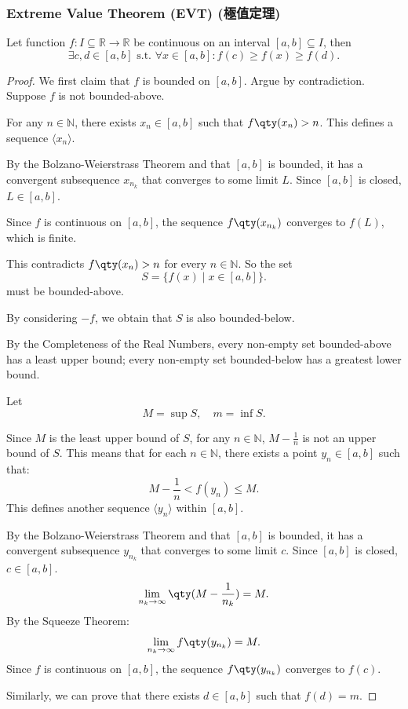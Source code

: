 \documentclass[a4paper,12pt]{report}
\begin{document}
\begin{itemize}
\begin{itemize}
\subsubsection{Extreme Value Theorem (EVT) (極值定理)}
Let function $f\colon I\subseteq\mathbb{R}\to\mathbb{R}$ be continuous on an interval $[a,b]\subseteq I$, then
\[\exists c,d \in [a, b] \text{\ s.t.\ }\forall x \in [a, b]\colon f(c)\geq f(x)\geq f(d).\]
\begin{proof}
We first claim that $f$ is bounded on $[a,b]$. Argue by contradiction. Suppose $f$ is not bounded-above.

For any $n\in\mathbb{N}$, there exists $x_n\in [a,b]$ such that $f\qty(x_n)>n$. This defines a sequence $\langle x_n\rangle$.

By the Bolzano-Weierstrass Theorem and that $[a,b]$ is bounded, it has a convergent subsequence $x_{n_k}$ that converges to some limit $L$. Since $[a,b]$ is closed, $L\in [a,b]$.

Since $f$ is continuous on $[a,b]$, the sequence $f\qty(x_{n_k})$ converges to $f(L)$, which is finite.

This contradicts $f\qty(x_n)>n$ for every $n\in\mathbb{N}$. So the set
\[S=\{f(x)\mid x\in [a,b]\}.\]
must be bounded-above.

By considering $-f$, we obtain that $S$ is also bounded-below.

By the Completeness of the Real Numbers, every non-empty set bounded-above has a least upper bound; every non-empty set bounded-below has a greatest lower bound.

Let
\[M=\sup S,\quad m=\inf S.\]

Since $M$ is the least upper bound of $S$, for any $n\in\mathbb{N}$, $M-\frac{1}{n}$ is not an upper bound of $S$. This means that for each $n\in\mathbb{N}$, there exists a point $y_n\in [a,b]$ such that:
\[M-\frac{1}{n}<f(y_n)\leq M.\]
This defines another sequence $\langle y_n\rangle$ within $[a, b]$.

By the Bolzano-Weierstrass Theorem and that $[a,b]$ is bounded, it has a convergent subsequence $y_{n_k}$ that converges to some limit $c$. Since $[a,b]$ is closed, $c\in [a,b]$.
\[\lim_{n_k\to \infty}\qty(M - \frac{1}{n_k}) = M.\]
By the Squeeze Theorem:
\[\lim_{n_k \to \infty} f\qty(y_{n_k}) = M.\]
Since $f$ is continuous on $[a,b]$, the sequence $f\qty(y_{n_k})$ converges to $f(c)$.

Similarly, we can prove that there exists $d\in [a,b]$ such that $f(d)=m$.
\end{proof}

\end{itemize}
\end{itemize}
\end{document}
